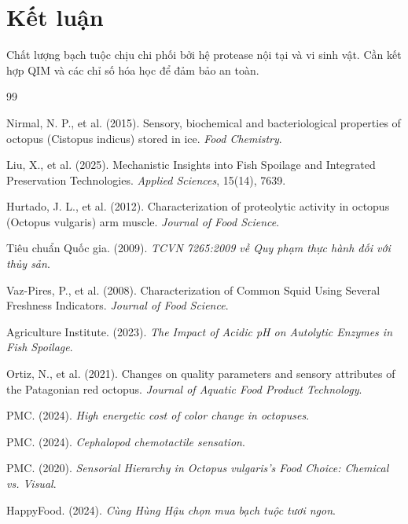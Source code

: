 \documentclass[12pt,a4paper]{report}
\begin{document}
\section{Kết luận}

Chất lượng bạch tuộc chịu chi phối bởi hệ protease nội tại và vi sinh vật. Cần kết hợp QIM và các chỉ số hóa học để đảm bảo an toàn.

\newpage
\renewcommand{\bibname}{Tài liệu tham khảo Chương 2}
\begin{thebibliography}{99}

 Nirmal, N. P., et al. (2015). Sensory, biochemical and bacteriological properties of octopus (Cistopus indicus) stored in ice. \textit{Food Chemistry}.

 Liu, X., et al. (2025). Mechanistic Insights into Fish Spoilage and Integrated Preservation Technologies. \textit{Applied Sciences}, 15(14), 7639.

 Hurtado, J. L., et al. (2012). Characterization of proteolytic activity in octopus (Octopus vulgaris) arm muscle. \textit{Journal of Food Science}.

 Tiêu chuẩn Quốc gia. (2009). \textit{TCVN 7265:2009 về Quy phạm thực hành đối với thủy sản}.

 Vaz-Pires, P., et al. (2008). Characterization of Common Squid Using Several Freshness Indicators. \textit{Journal of Food Science}.

 Agriculture Institute. (2023). \textit{The Impact of Acidic pH on Autolytic Enzymes in Fish Spoilage}.

 Ortiz, N., et al. (2021). Changes on quality parameters and sensory attributes of the Patagonian red octopus. \textit{Journal of Aquatic Food Product Technology}.

 PMC. (2024). \textit{High energetic cost of color change in octopuses}.

 PMC. (2024). \textit{Cephalopod chemotactile sensation}.

 PMC. (2020). \textit{Sensorial Hierarchy in Octopus vulgaris's Food Choice: Chemical vs. Visual}.

 HappyFood. (2024). \textit{Cùng Hùng Hậu chọn mua bạch tuộc tươi ngon}.


\end{thebibliography}
\end{document}

